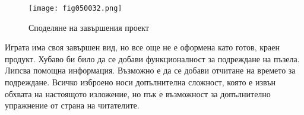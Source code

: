 \begin{figure}[H]
  \centering
  \texttt{[image: fig050032.png]}
  \caption{Споделяне на завършения проект}
\label{fig050032}
\end{figure}

Играта има своя завършен вид, но все още не е оформена като готов, краен продукт. Хубаво би било да се добави функционалност за подреждане на пъзела. Липсва помощна информация. Възможно е да се добави отчитане на времето за подреждане. Всичко изброено носи допълнителна сложност, която е извън обхвата на настоящото изложение, но пък е възможност за допълнително упражнение от страна на читателите.

